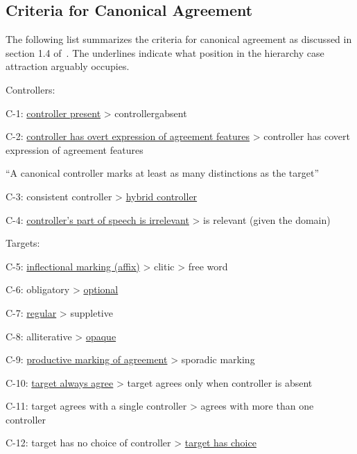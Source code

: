 \documentclass[a4paper, 12pt, article]{memoir}
\begin{document}
\begin{appendices}
	\chapter{Criteria for Canonical Agreement}

	The following list summarizes the criteria for canonical agreement as
	discussed in section 1.4 of~\textcite[pp.\ 8ff.]{Corbett2006}.
	The underlines indicate what position in the hierarchy case attraction
	arguably occupies.

	\begin{raggedright}

		\begin{compactitem}
			\item Controllers:
			\begin{compactitem}
				\item C-1: \uline{controller present} > controllergabsent
				\item C-2: \uline{controller has overt expression of agreement features}
				> controller has covert expression of agreement features
				\begin{compactitem}
					\item ``A canonical controller marks at least as many distinctions
					as the target''
				\end{compactitem}
				\item C-3: consistent controller > \uline{hybrid controller}
				\item C-4: \uline{controller's part of speech is irrelevant} > is
				relevant (given the domain)
			\end{compactitem}
			\item Targets:
			\begin{compactitem}
				\item C-5: \uline{inflectional marking (affix)} > clitic > free word
				\item C-6: obligatory > \uline{optional}
				\item C-7: \uline{regular} > suppletive
				\item C-8: alliterative > \uline{opaque}
				\item C-9: \uline{productive marking of agreement} > sporadic marking
				\item C-10: \uline{target always agree} > target agrees only when
				controller is absent
				\item C-11: target agrees with a single controller > agrees with more than
				one controller
				\item C-12: target has no choice of controller > \uline{target has choice
}
\end{compactitem}
\end{compactitem}
\end{raggedright}
\end{appendices}
\end{document}
